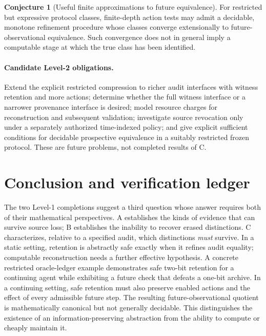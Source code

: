 \documentclass[11pt,letterpaper]{article}
\theoremstyle{definition}
\newtheorem{conjecture}[theorem]{Conjecture}
\begin{document}
\begin{conjecture}[Useful finite approximations to future equivalence]
For restricted but expressive protocol classes, finite-depth action tests may admit a decidable, monotone refinement procedure whose classes converge extensionally to future-observational equivalence. Such convergence does not in general imply a computable stage at which the true class has been identified.
\end{conjecture}

\paragraph{Candidate Level-2 obligations.} Extend the explicit restricted compression to richer audit interfaces with witness retention and more actions; determine whether the full witness interface or a narrower provenance interface is desired; model resource charges for reconstruction and subsequent validation; investigate source revocation only under a separately authorized time-indexed policy; and give explicit sufficient conditions for decidable prospective equivalence in a suitably restricted frozen protocol. These are future problems, not completed results of C.

\section{Conclusion and verification ledger}
The two Level-1 completions suggest a third question whose answer requires both of their mathematical perspectives. A establishes the kinds of evidence that can survive source loss; B establishes the inability to recover erased distinctions. C characterizes, relative to a specified audit, which distinctions \emph{must} survive. In a static setting, retention is abstractly safe exactly when it refines audit equality; computable reconstruction needs a further effective hypothesis. A concrete restricted oracle-ledger example demonstrates safe two-bit retention for a continuing agent while exhibiting a future check that defeats a one-bit archive. In a continuing setting, safe retention must also preserve enabled actions and the effect of every admissible future step. The resulting future-observational quotient is mathematically canonical but not generally decidable. This distinguishes the existence of an information-preserving abstraction from the ability to compute or cheaply maintain it.
\end{document}
